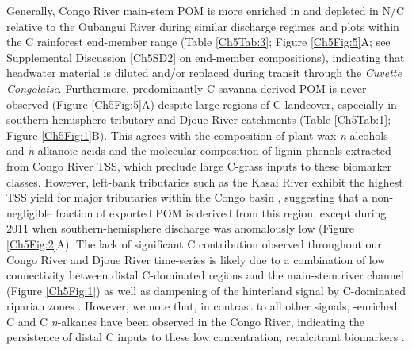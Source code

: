 Generally, Congo River main-stem POM is more enriched in  and depleted in N/C relative to the Oubangui River during similar discharge regimes \citep[Figure \ref{Ch5Fig:6}A--B;][]{Bouillon:2012cw,Bouillon:2014ko} and plots within the C rainforest end-member range (Table \ref{Ch5Tab:3}; Figure \ref{Ch5Fig:5}A; see Supplemental Discussion \ref{Ch5SD2} on end-member compositions), indicating that headwater material is diluted and/or replaced during transit through the \textit{Cuvette Congolaise}. Furthermore, predominantly C-savanna-derived POM is never observed (Figure \ref{Ch5Fig:5}A) despite large regions of C landcover, especially in southern-hemisphere tributary and Djoue River catchments (Table \ref{Ch5Tab:1}; Figure \ref{Ch5Fig:1}B). This agrees with the  composition of plant-wax \textit{n}-alcohols and \textit{n}-alkanoic acids \citep{Hemingway:2016bq} and the molecular composition of lignin phenols \citep{Spencer:2016ho} extracted from Congo River TSS, which preclude large C-grass inputs to these biomarker classes. However, left-bank tributaries such as the Kasai River exhibit the highest TSS yield for major tributaries within the Congo basin \citep{Laraque:2009fz}, suggesting that a non-negligible fraction of exported POM is derived from this region, except during 2011 when southern-hemisphere discharge was anomalously low (Figure \ref{Ch5Fig:2}A). The lack of significant C contribution observed throughout our Congo River and Djoue River time-series is likely due to a combination of low connectivity between distal C-dominated regions and the main-stem river channel (Figure \ref{Ch5Fig:1}) as well as dampening of the hinterland signal by C-dominated riparian zones \citep{Bouillon:2012cw}. However, we note that, in contrast to all other signals, -enriched C and C \textit{n}-alkanes have been observed in the Congo River, indicating the persistence of distal C inputs to these low concentration, recalcitrant biomarkers \citep{Hemingway:2016bq}.

